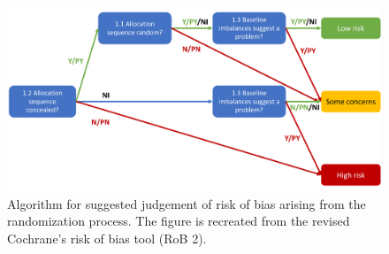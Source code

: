 \documentclass[sn-mathphys,Numbered]{sn-jnl}%
\theoremstyle{thmstyleone}%
\theoremstyle{thmstyletwo}%
\theoremstyle{thmstylethree}%
\begin{document}
%
%
%
\begin{figure}
    \centering
    \includegraphics[width=0.80\columnwidth]{figures/flowchart.pdf}
    \caption{Algorithm for suggested judgement of risk of bias arising from the randomization process. The figure is recreated from the revised Cochrane's risk of bias tool (RoB 2).~\cite{sterne2019rob}}
    \label{fig:flowchart}
\end{figure}
%
%
%

%
%
%
\end{document}
